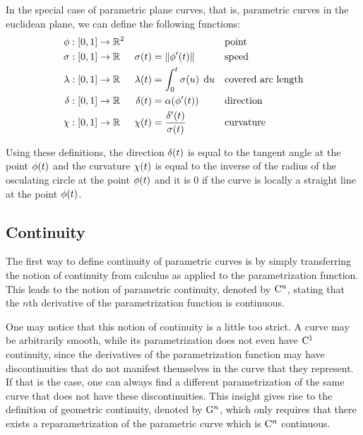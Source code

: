 \documentclass[a4paper]{article}
\begin{document}
			In the special case of parametric plane curves, that is, parametric curves in the euclidean plane, we can define the following functions:
			\begin{align*}
				\phi    & : \function{\unit}{\R{2}} &                    &                                                && \text{point}\\
				\sigma  & : \function{\unit}{\RR}   & \apply{\sigma}{t}  & = \xn{\apply{\phi'}{t}}                        && \text{speed}\\
				\lambda & : \function{\unit}{\RR}   & \apply{\lambda}{t} & = \integral{0}{t}{\apply{\sigma}{u}}{u}        && \text{covered arc length}\\
				\delta  & : \function{\unit}{\RR}   & \apply{\delta}{t}  & = \apply{\alpha}{\apply{\phi'}{t}}             && \text{direction}\\
				\chi    & : \function{\unit}{\RR}   & \apply{\chi}{t}    & = \frac{\apply{\delta'}{t}}{\apply{\sigma}{t}} && \text{curvature}
			\end{align*}

			Using these definitions, the direction \(\delta\!\left( t \right)\) is equal to the tangent angle at the point \(\phi\!\left( t \right)\) and the curvature \(\chi\!\left( t \right)\) is equal to the inverse of the radius of the osculating circle at the point \(\phi\!\left( t \right)\) and it is \(0\) if the curve is locally a straight line at the point \(\phi\!\left( t \right)\).

		\subsection{Continuity}
		\label{section:continuity}

			The first way to define continuity of parametric curves is by simply transferring the notion of continuity from calculus as applied to the parametrization function. This leads to the notion of parametric continuity, denoted by \(\mathrm{C}^{n}\), stating that the \(n\)th derivative of the parametrization function is continuous.

			One may notice that this notion of continuity is a little too strict. A curve may be arbitrarily smooth, while its parametrization does not even have \(\mathrm{C}^{1}\) continuity, since the derivatives of the parametrization function may have discontinuities that do not manifest themselves in the curve that they represent. If that is the case, one can always find a different parametrization of the same curve that does not have these discontinuities. This insight gives rise to the definition of geometric continuity, denoted by \(\mathrm{G}^{n}\), which only requires that there exists a reparametrization of the parametric curve which is \(\mathrm{C}^{n}\) continuous.
\end{document}
